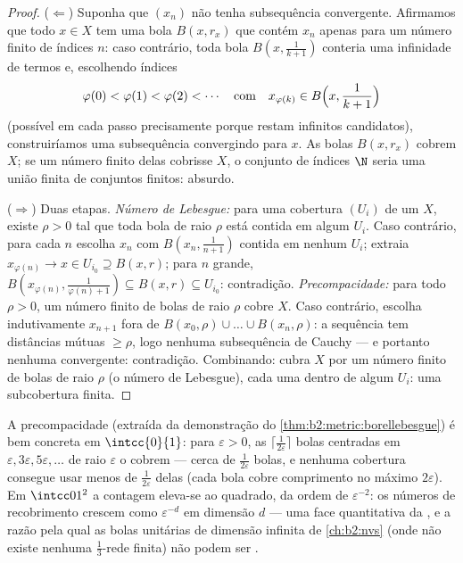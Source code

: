\begin{proof}
($\Leftarrow$) Suponha que $(x_n)$ não tenha subsequência convergente. Afirmamos
que todo $x \in X$ tem uma bola $B(x, r_x)$ que contém $x_n$
apenas para um número finito de índices $n$: caso contrário, toda bola
$B(x, \frac1{k+1})$ conteria uma infinidade de termos e,
escolhendo índices
\[
\varphi(0) < \varphi(1) < \varphi(2) < \cdots
\quad\text{com}\quad
x_{\varphi(k)} \in B\Bigl(x, \frac{1}{k+1}\Bigr)
\]
(possível em cada passo precisamente porque restam infinitos
candidatos), construiríamos uma subsequência convergindo para $x$.
As bolas $B(x, r_x)$ cobrem $X$; se um número finito delas
cobrisse $X$, o conjunto de índices $\N$ seria uma união finita de
conjuntos finitos: absurdo.

($\Rightarrow$) Duas etapas. \emph{Número de Lebesgue:} para uma cobertura 
$(U_i)$ de um  $X$, existe $\rho > 0$ tal que toda bola
de raio $\rho$ está contida em algum $U_i$. Caso contrário, para cada $n$ escolha
$x_n$ com $B(x_n, \frac{1}{n+1})$ contida em nenhum $U_i$; extraia
$x_{\varphi(n)} \to x \in U_{i_0} \supseteq B(x, r)$; para $n$ grande,
$B(x_{\varphi(n)}, \frac{1}{\varphi(n)+1}) \subseteq B(x, r)
\subseteq U_{i_0}$: contradição. \emph{Precompacidade:} para
todo $\rho > 0$, um número finito de bolas de raio $\rho$ cobre $X$.
Caso contrário, escolha indutivamente $x_{n+1}$ fora de $B(x_0, \rho) \cup
\dots \cup B(x_n, \rho)$: a sequência tem distâncias mútuas $\geq
\rho$, logo nenhuma subsequência de Cauchy --- e portanto nenhuma convergente:
contradição. Combinando: cubra $X$ por um número finito de bolas de raio
$\rho$ (o número de Lebesgue), cada uma dentro de algum $U_i$: uma
subcobertura finita.
\end{proof}

\begin{example}\label{ex:b2:metric:epsnet}
A precompacidade (extraída da demonstração do
\cref{thm:b2:metric:borellebesgue}) é bem concreta em
$\intcc{0}{1}$: para $\varepsilon > 0$, as $\lceil
\frac{1}{2\varepsilon}\rceil$ bolas centradas em $\varepsilon,
3\varepsilon, 5\varepsilon, \dots$ de raio $\varepsilon$
o cobrem --- cerca de $\frac1{2\varepsilon}$ bolas, e nenhuma cobertura
consegue usar menos de $\frac{1}{2\varepsilon}$ delas (cada
bola cobre comprimento no máximo $2\varepsilon$). Em $\intcc01^2$
a contagem eleva-se ao quadrado, da ordem de $\varepsilon^{-2}$: os números de recobrimento
crescem como $\varepsilon^{-d}$ em dimensão $d$ --- uma face
quantitativa da , e a razão pela qual as bolas unitárias
de dimensão infinita de \cref{ch:b2:nvs} (onde não existe nenhuma
$\frac13$-rede finita) não podem ser .
\end{example}

